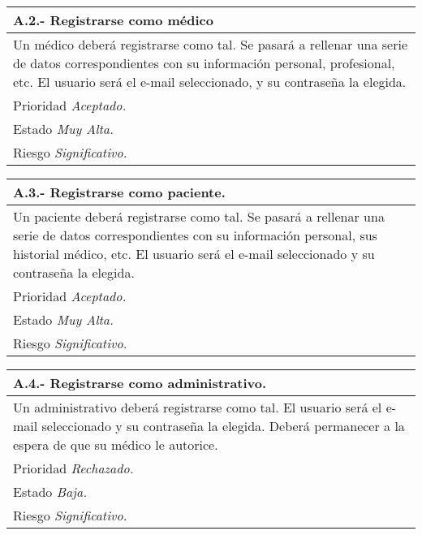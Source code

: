 	\begin{center}
	\begin{tabulary}{15cm}{|L|}
		\hline
			\bf{A.2.- Registrarse como médico} \\
		\hline
			Un médico deberá registrarse como tal. Se pasará a rellenar una serie de datos correspondientes con su información personal, profesional, etc. El usuario será el e-mail seleccionado, y su contraseña la elegida.\\
		\hline
			Prioridad \textit{Aceptado.} \\
		\hline
			Estado \textit{Muy Alta.} \\
		\hline
			Riesgo \textit{Significativo.} \\
		\hline
	\end{tabulary}
	\end{center}

	\begin{center}
	\begin{tabulary}{15cm}{|L|}
		\hline
			\bf{A.3.- Registrarse como paciente.} \\
		\hline
			Un paciente deberá registrarse como tal. Se pasará a rellenar una serie de datos correspondientes con su información personal, sus historial médico, etc. El usuario será el e-mail seleccionado y su contraseña la elegida. \\
		\hline
			Prioridad \textit{Aceptado.} \\
		\hline
			Estado \textit{Muy Alta.} \\
		\hline
			Riesgo \textit{Significativo.} \\
		\hline
	\end{tabulary}
	\end{center}

	\begin{center}
	\begin{tabulary}{15cm}{|L|}
		\hline
			\bf{A.4.- Registrarse como administrativo.} \\
		\hline
			Un administrativo deberá registrarse como tal. El usuario será el e-mail seleccionado y su contraseña la elegida. Deberá permanecer a la espera de que su médico le autorice. \\
		\hline
			Prioridad \textit{Rechazado.} \\
		\hline
			Estado \textit{Baja.} \\
		\hline
			Riesgo \textit{Significativo.} \\
		\hline
	\end{tabulary}
	\end{center}

